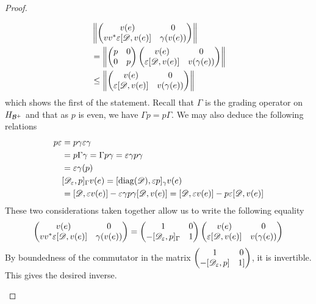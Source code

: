 \begin{theorem}
\begin{proof}
\begin{enumerate}
		\begin{align*}
			&\left \Vert \begin{pmatrix}v(e) & 0 \\ vv^*\varepsilon[\mathscr{D},v(e)] & \gamma(v(e)) \end{pmatrix} \right \Vert\\
			&=\left \Vert \begin{pmatrix} p & 0 \\ 0 & p \end{pmatrix} \begin{pmatrix} v(e)& 0 \\ \varepsilon[\mathscr{D},v(e)] & v(\gamma(e))  \end{pmatrix} \right \Vert \\
			&\leq \left \Vert \begin{pmatrix} v(e)& 0 \\ \varepsilon[\mathscr{D},v(e)] & v(\gamma(e))  \end{pmatrix} \right \Vert
		\end{align*}
		which shows the first of the statement. Recall that $\Gamma$ is the grading operator on $H_{\mathcal{B}^+}$ and that as $p$ is even, we have $\Gamma p=p\Gamma$. 
		We may also deduce the following relations 
		\begin{align*}
			p\varepsilon&=p\gamma \varepsilon \gamma \\
			&=p\Gamma \gamma=\Gamma p \gamma=\varepsilon \gamma p \gamma \\
			&=\varepsilon \gamma(p)\\ 
			&[\mathscr{D}_\varepsilon,p]_\Gamma v(e)=[\operatorname{diag}(\mathscr{D}),\varepsilon p]_{\gamma}v(e) \\
			&=[\mathscr{D},\varepsilon v(e)]-\varepsilon \gamma p \gamma [\mathscr{D},v(e)]=[\mathscr{D},\varepsilon v(e)]-p\varepsilon[\mathscr{D},v(e)]
		\end{align*}
		These two considerations taken together allow us to write the following equality
		\begin{align*}
			\begin{pmatrix} v(e) & 0 \\ vv^* \varepsilon [\mathscr{D},v(e)] & \gamma(v(e))\end{pmatrix}=\begin{pmatrix} 1 & 0 \\ -[\mathscr{D}_\varepsilon,p]_\Gamma & 1\end{pmatrix}\begin{pmatrix} v(e) & 0 \\ \varepsilon [\mathscr{D},v(e)] & v(\gamma(e))\end{pmatrix}
		\end{align*}
		By boundedness of the commutator in the matrix $\begin{pmatrix} 1 & 0 \\ -[\mathscr{D}_\varepsilon,p] & 1 ] \end{pmatrix}$, it is invertible. This gives the desired inverse. 
	\end{enumerate}
	\end{proof}
\end{theorem}
